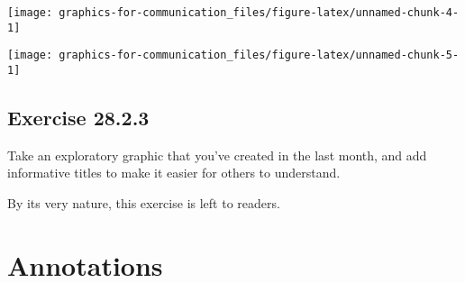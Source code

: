 \documentclass[]{book}
\newenvironment{Shaded}{\begin{snugshade}}{\end{snugshade}}
\newcommand{\DataTypeTok}[1]{\textcolor[rgb]{0.13,0.29,0.53}{#1}}
\newcommand{\KeywordTok}[1]{\textcolor[rgb]{0.13,0.29,0.53}{\textbf{#1}}}
\newcommand{\NormalTok}[1]{#1}
\newcommand{\OperatorTok}[1]{\textcolor[rgb]{0.81,0.36,0.00}{\textbf{#1}}}
\newcommand{\OtherTok}[1]{\textcolor[rgb]{0.56,0.35,0.01}{#1}}
\newcommand{\StringTok}[1]{\textcolor[rgb]{0.31,0.60,0.02}{#1}}
\theoremstyle{plain}
\theoremstyle{remark}
\begin{document}
\begin{center}\texttt{[image: graphics-for-communication\_files/figure-latex/unnamed-chunk-4-1]} \end{center}

\begin{Shaded}
\end{Shaded}

\begin{center}\texttt{[image: graphics-for-communication\_files/figure-latex/unnamed-chunk-5-1]} \end{center}

\hypertarget{exercise-28.2.3}{%
\subsection*{\texorpdfstring{Exercise
{28.2.3}}{Exercise 28.2.3}}\label{exercise-28.2.3}}

Take an exploratory graphic that you've created in the last month, and
add informative titles to make it easier for others to understand.

By its very nature, this exercise is left to readers.

\hypertarget{annotations}{%
\section{Annotations}\label{annotations}}
\end{document}
